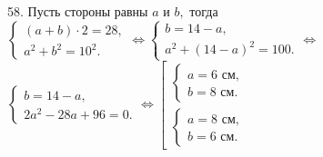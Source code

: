 58. Пусть стороны равны $a$ и $b,$ тогда $\begin{cases}(a+b)\cdot2=28,\\ a^2+b^2=10^2.\end{cases}\Leftrightarrow
\begin{cases}b=14-a,\\ a^2+(14-a)^2=100.\end{cases}\Leftrightarrow$\\$
\begin{cases}b=14-a,\\ 2a^2-28a+96=0.\end{cases}\Leftrightarrow
\left[\begin{array}{l}\begin{cases}a=6\text{ см},\\ b=8\text{ см}.\end{cases}\\ \begin{cases}a=8\text{ см},\\ b=6\text{ см}.\end{cases}\end{array}\right.$\\
